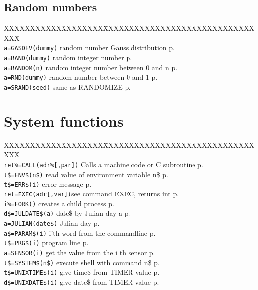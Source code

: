 \subsection{Random numbers}
\begin{tabbing}
XXXXXXXXXXXXXXXXXXX\=XXXXXXXXXXXXXXXXXXXXXXXXXXXXXXXX\=\kill\\
\verb|a=GASDEV(dummy)| 	\> random number Gauss distribution \> p.\pageref{GASDEV}\\
\verb|a=RAND(dummy)|	\> random integer number \> p.\pageref{RAND}\\
\verb|a=RANDOM(n)|	\> random integer number between 0 and n \> p.\pageref{RANDOM}\\
\verb|a=RND(dummy)|	\> random number between 0 and 1 \> p.\pageref{RND}\\
\verb|a=SRAND(seed)|	\> same as RANDOMIZE \> p.\pageref{SRAND}\\

\end{tabbing}


\section{System functions}
\begin{tabbing}
XXXXXXXXXXXXXXXXXXX\=XXXXXXXXXXXXXXXXXXXXXXXXXXXXXXXX\=\kill\\
\verb|ret%=CALL(adr%[,par])|\> Calls a machine code or C subroutine \> p.\pageref{CALL}\\
\verb|t$=ENV$(n$)|	\>  read value of environment variable n\$\> p.\pageref{ENVS}\\
\verb|t$=ERR$(i)| \> error message\> p.\pageref{ERRS}\\
\verb|ret=EXEC(adr[,var])|\>see command EXEC, returns int\> p.\pageref{EXEC}\\
\verb|i%=FORK()| \> creates a child process \> p.\pageref{FORK}\\
\verb|d$=JULDATE$(a)|  	\>date\$ by Julian day a\> p.\pageref{JULDATES}\\
\verb|a=JULIAN(date$)| 	\>Julian day\> p.\pageref{JULIAN}\\
\verb|a$=PARAM$(i)| \> i'th word from the commandline \> p.\pageref{PARAMS}\\
\verb|t$=PRG$(i)| \> program line\> p.\pageref{PRGS}\\
\verb|a=SENSOR(i)| \> get the value from the i th sensor \> p.\pageref{SENSOR}\\
\verb|t$=SYSTEM$(n$)| \>execute shell with command n\$\> p.\pageref{SYSTEMS}\\
\verb|t$=UNIXTIME$(i)| \>give time\$ from TIMER value\> p.\pageref{UNIXTIMES}\\
\verb|d$=UNIXDATE$(i)| \>give date\$ from TIMER value\> p.\pageref{UNIXDATES}\\
\end{tabbing}

